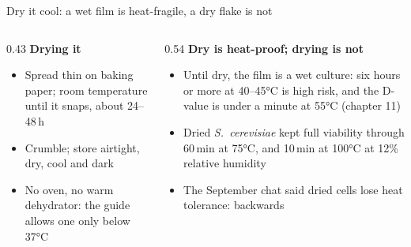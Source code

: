 \documentclass[aspectratio=169,11pt]{beamer}
\begin{document}
\begin{frame}{Dry it cool: a wet film is heat-fragile, a dry flake is not}
  \begin{columns}[T]
    \begin{column}{0.43\textwidth}
      \small
      \textbf{\color{crust}Drying it}
      \begin{itemize}
        \item Spread thin on baking paper; room temperature until it snaps, about 24--48\,h
        \item Crumble; store airtight, dry, cool and dark
        \item No oven, no warm dehydrator: the guide allows one only below 37°C
      \end{itemize}
    \end{column}
    \begin{column}{0.54\textwidth}
      \small
      \textbf{\color{crust}Dry is heat-proof; drying is not}
      \begin{itemize}
        \item Until dry, the film is a wet culture: six hours or more at 40--45°C is high risk, and the D-value is under a minute at 55°C (chapter 11)
        \item Dried \textit{S.\ cerevisiae} kept full viability through 60\,min at 75°C, and 10\,min at 100°C at 12\% relative humidity
        \item The September chat said dried cells lose heat tolerance: backwards
      \end{itemize}
    \end{column}
  \end{columns}
\end{frame}
\end{document}
